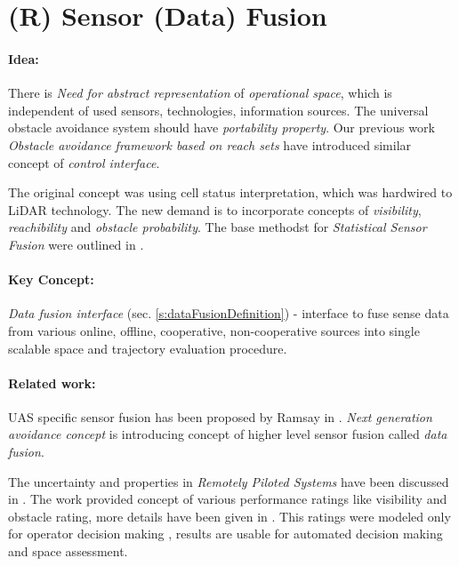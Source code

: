 \section{(R) Sensor (Data) Fusion}\label{s:dataFusionProbabilisticModelTheory}
\paragraph{Idea:}  There is \emph{Need for abstract representation} of \emph{operational space}, which is independent of used sensors, technologies, information sources. The universal obstacle avoidance system should have \emph{portability property}. Our previous work \emph{Obstacle avoidance framework based on reach sets} \cite{gomola2017obstacle} have introduced similar concept of \emph{control interface}.

The original concept was using cell status interpretation, which was hardwired to LiDAR technology.  The new demand is to incorporate concepts of \emph{visibility}, \emph{reachibility} and \emph{obstacle probability}. The base methodst for \emph{Statistical Sensor Fusion} were outlined in \cite{gustafsson2010statistical}.

\paragraph{Key Concept:} \emph{Data fusion interface} (sec. \ref{s:dataFusionDefinition}) - interface to fuse sense data from various online, offline, cooperative, non-cooperative sources into single scalable {space and trajectory evaluation procedure}.
    
\paragraph{Related work:} \noindent UAS specific sensor fusion has been proposed by Ramsay in \cite{ramasamy2014avionics}. \emph{Next generation avoidance concept} \cite{ramasamy2014next} is introducing concept of higher level sensor fusion called \emph{data fusion}. 

The uncertainty and properties in \emph{Remotely Piloted Systems} have been discussed in \cite{chynchenko2016remotely}. The work provided concept of various performance ratings like visibility and obstacle rating, more details have been given in \cite{shmelova2016modeling}. This ratings were modeled only for operator decision making \cite{kharchenko2017modelling}, results are usable for automated decision making and space assessment. 

